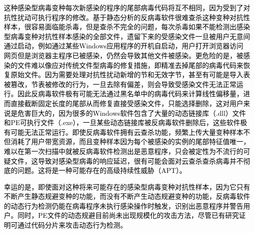\textcolor{black}{这种感染型病毒变种每次新感染的程序的尾部病毒代码将互不相同，因为受到了对抗性扰动可执行程序的修改。基于静态分析的反病毒软件很难查杀这种变种对抗性样本，很容易面临能杀毒，但是查杀不完全的问题，每次杀毒如果不能检测出感染型病毒变种对抗性样本感染的全部文件，遗留下来的受感染文件一旦被用户无意间通过启动，例如通过某些Windows应用程序的开机自启动，用户打开浏览器访问网页但是浏览器主程序已被感染，仍然会导致其他文件被感染。更危险的是，被感染的文件难以像应对传统文件型病毒的修复措施，即精准去掉尾部的病毒代码来恢复原始文件。因为需要处理对抗性扰动新增的节和无效字节，甚至有可能是导入表被篡改，节表被修改的行为，一旦去除有偏差，则会导致受感染文件无法正常运行。因此反病毒软件极有可能无法通过黑名单中的病毒代码来计算线性偏移量，进而直接截断固定长度的尾部从而修复直接受感染文件，只能选择删除，这对用户来说是危害巨大的，因为很多的Windows软件包含了大量的动态链接库（.dll）文件和PE可执行文件（.exe），一旦某些动态链接库被反病毒软件删除后，这些软件极有可能无法正常运行。即使反病毒软件拥有云查杀功能，频繁上传大量变种样本不但消耗了用户带宽资源，而且变种样本因为每个被感染的实例的尾部特征值唯一，难以在第一次扫描中就被反病毒软件检测出是恶意程序，只会被定性为不流行的可疑文件，这导致对感染型病毒的响应延迟，很有可能会面对云查杀查杀病毒并不彻底的问题。这将是一种可能存在的高级持续性威胁（APT）。}

\textcolor{black}{幸运的是，即使面对这种将来可能存在的感染型病毒变种对抗性样本，因为它只有不断产生静态规避变种的功能，而没有不断产生动态规避变种的功能，反病毒软件的动态行为检测仍能在病毒程序未执行感染操作时触发，识别出恶意程序并警告用户。同时，PE文件的动态规避目前尚未出现规模化的攻击方法，尽管已有研究证明可通过代码分片来攻击动态行为检测\cite{ref38}\cite{ref39}\cite{ref40}。}

